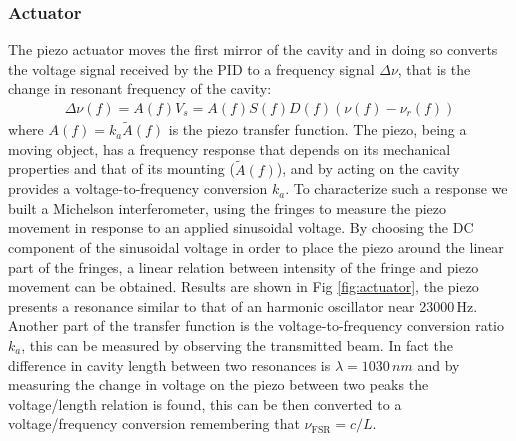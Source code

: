 \subsubsection{Actuator}

The piezo actuator moves the first mirror of the cavity and in doing so converts the voltage signal received by the PID to a frequency signal $\Delta \nu$, that is the change in resonant frequency of the cavity:
\begin{align}
	\Delta \nu(f) = A(f)V_s = A(f)S(f)D(f)(\nu(f)-\nu_r(f))
\end{align}
where $A(f) = k_a \tilde A(f)$ is the piezo transfer function. The piezo, being a moving object, has a frequency response that depends on its mechanical properties and that of its mounting ($\tilde A(f)$), and by acting on the cavity provides a voltage-to-frequency conversion $k_a$. To characterize such a response we built a Michelson interferometer, using the fringes to measure the piezo movement in response to an applied sinusoidal voltage. By choosing the DC component of the sinusoidal voltage in order to place the piezo around the linear part of the fringes, a linear relation between intensity of the fringe and piezo movement can be obtained. Results are shown in Fig \ref{fig:actuator}, the piezo presents a resonance similar to that of an harmonic oscillator near 23000\,Hz. Another part of the transfer function is the voltage-to-frequency conversion ratio $k_a$, this can be measured by observing the transmitted beam. In fact the difference in cavity length between two resonances is $\lambda = 1030\,nm$ and by measuring the change in voltage on the piezo between two peaks the voltage/length relation is found, this can be then converted to a voltage/frequency conversion remembering that $\nu_\mathrm{FSR} = c/L$.

